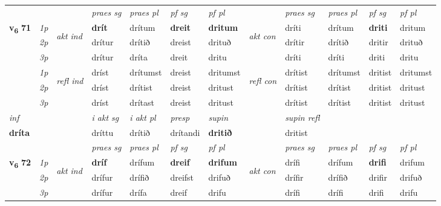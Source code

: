 \begin{longtable}[l]{X>{\footnotesize\itshape}llXXXXlXXXX}
   \midrule
 & &   & \textit{praes sg}  & \textit{praes pl}    & \textit{ pf sg} & \textit{pf pl} & & \textit{praes sg}  & \textit{praes pl}    & \textit{pf sg} & \textit{pf pl }  \\ \cmidrule{4-7} \cmidrule{9-12}
 \multirow{2}{*}{{{\textbf{v{\textsubscript{6}}} \Large{\textbf{71}}}}}  & 1p & \multirow{3}{*}{\begin{turn}{90}\textit{akt ind}\end{turn}} & \textbf{drít} & drítum & \textbf{dreit} & \textbf{dritum} & \multirow{3}{*}{\begin{turn}{90}\textit{akt con}\end{turn}} &dríti & drítum & \textbf{driti} & dritum\\*
 & 2p &  &  drítur  & drítið & dreist & drituð & & drítir & drítið & dritir & drituð \\*
 & 3p &  & drítur & dríta & dreit & dritu & & dríti & dríti& driti & dritu \\*
\cmidrule{4-7} \cmidrule{9-12}
 & 1p & \multirow{3}{*}{\begin{turn}{90}\textit{refl ind}\end{turn}}  & dríst & drítumst & dreist & dritumst & \multirow{3}{*}{\begin{turn}{90}\textit{refl con}\end{turn}}  &drítist & drítumst & dritist & dritumst \\*
 & 2p &  & dríst & drítist & dreist & dritust & &drítist & drítist & dritist & dritust \\*
 & 3p  & & dríst & drítast & dreist & dritust & & drítist & drítist& dritist & dritust \\*
\cmidrule{4-7} \cmidrule{9-12}

   {\textit{inf}} & &  & \textit{i akt sg} & \textit{i akt pl}   & \textit{presp} & \textit{supin} && \textit{supin refl}  \\*
  {\textbf{dríta}} & && dríttu  & drítið   & drítandi &  \textbf{dritið} && dritist  \\*

\midrule

 & &   & \textit{praes sg}  & \textit{praes pl}    & \textit{ pf sg} & \textit{pf pl} & & \textit{praes sg}  & \textit{praes pl}    & \textit{pf sg} & \textit{pf pl }  \\ \cmidrule{4-7} \cmidrule{9-12}
 \multirow{2}{*}{{{\textbf{v{\textsubscript{6}}} \Large{\textbf{72}}}}}  & 1p & \multirow{3}{*}{\begin{turn}{90}\textit{akt ind}\end{turn}} & \textbf{dríf} & drífum & \textbf{dreif} & \textbf{drifum} & \multirow{3}{*}{\begin{turn}{90}\textit{akt con}\end{turn}} &drífi & drífum & \textbf{drifi} & drifum\\*
 & 2p &  &  drífur  & drífið & dreifst & drifuð & & drífir & drífið & drifir & drifuð \\*
 & 3p &  & drífur & drífa & dreif & drifu & & drífi & drífi& drifi & drifu \\*
\cmidrule{4-7} \cmidrule{9-12}


\end{longtable}
